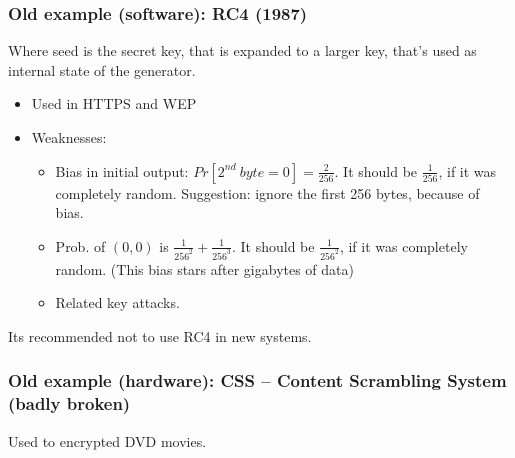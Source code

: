 \documentclass[12pt]{book}
\begin{document}
\subsubsection{Old example (software): RC4 (1987)}
\begin{center}
\end{center}Where seed is the secret key, that is expanded to a larger key, that's used as internal state of the generator.
\begin{itemize}
	\item Used in HTTPS and WEP
	\item Weaknesses:
	\begin{itemize}
		\item Bias in initial output: $Pr[2^{nd}\ byte=0]=\frac{2}{256}$. It should be $\frac{1}{256}$, if it was completely random. Suggestion: ignore the first 256 bytes, because of bias.
		\item Prob. of $(0,0)$ is $\frac{1}{256^{2}}+\frac{1}{256^{3}}$. It should be $\frac{1}{256^{2}}$, if it was completely random. (This bias stars after gigabytes of data)
		\item Related key attacks.
	\end{itemize}
\end{itemize}
Its recommended not to use RC4 in new systems.

\subsubsection{Old example (hardware): CSS -- Content Scrambling System (badly broken)}
Used to encrypted DVD movies.
\end{document}
